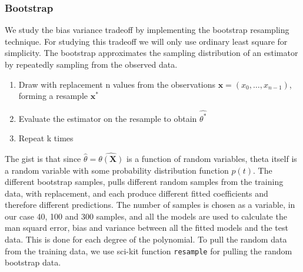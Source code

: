 \documentclass[aps,rmp,reprint,raggedbottom,amsmath,amssymb,longbibliography]{revtex4-1}
\begin{document}
\subsubsection{Bootstrap}
We study the bias variance tradeoff by implementing the bootstrap resampling technique.
For studying this tradeoff we will only use ordinary least square for simplicity.
The bootstrap approximates the sampling distribution of an estimator by repeatedly sampling
from the observed data.
\begin{enumerate}
    \item Draw with replacement n values from the observations
    $\boldsymbol{x} = (x_0,\ldots,x_{n-1})$, forming a resample $\boldsymbol{x^*}$
    \item Evaluate the estimator on the resample to obtain $\hat{\theta^*}$
    \item Repeat k times
\end{enumerate}
\cite[p.~65]{LectureNotes}
The gist is that since $\hat{\theta} = \hat{\theta(\boldsymbol{X})}$ is
a function of random variables, theta itself is a random variable with some
probability distribution function $p(t)$. The different bootstrap samples,
pulls different random samples from the training data, with replacement,
and each produce different fitted coefficients and therefore different predictions.
The number of samples is chosen as a variable, in our case 40, 100 and 300 samples,
and all the models are used to calculate the man squard error, bias and variance between
all the fitted models and the test data. This is done for each degree of the polynomial.
To pull the random data from the training data, we use sci-kit function \texttt{resample}
for pulling the random bootstrap data.
\end{document}
